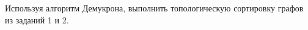 \question 
Используя алгоритм Демукрона, выполнить топологическую сортировку графов из заданий 1 и 2.

